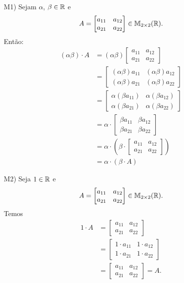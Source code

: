 \documentclass[12pt]{exam}
\begin{document}
\begin{itemize}
        \item[M1)] Sejam $\alpha$, $\beta \in \mathbb{R}$ e
        \[
        A = \begin{bmatrix} a_{11} & a_{12}\\a_{21} & a_{22}\end{bmatrix} \in \mathbb{M}_{2 \times 2}(\mathbb{R}).
        \]
        Então:
        \begin{align*}
            (\alpha\beta)\cdot A & = (\alpha\beta)\begin{bmatrix} a_{11} & a_{12}\\a_{21} & a_{22}\end{bmatrix}
            \\ &= \begin{bmatrix} (\alpha\beta)a_{11} & (\alpha\beta)a_{12}\\(\alpha\beta)a_{21} & (\alpha\beta)a_{22}\end{bmatrix}
            \\ &= \begin{bmatrix} \alpha(\beta a_{11}) & \alpha(\beta a_{12})\\\alpha(\beta a_{21}) & \alpha(\beta a_{22})\end{bmatrix}
            \\ &= \alpha\cdot\begin{bmatrix} \beta a_{11} & \beta a_{12}\\\beta a_{21} & \beta a_{22}\end{bmatrix}
            \\ &= \alpha\cdot\left(\beta\cdot\begin{bmatrix} a_{11} & a_{12}\\a_{21} & a_{22}\end{bmatrix}\right)
            \\ &= \alpha\cdot(\beta\cdot A)
        \end{align*}

        \item[M2)] Seja $1 \in \mathbb{R}$ e
        \[
        A = \begin{bmatrix} a_{11} & a_{12}\\a_{21} & a_{22}\end{bmatrix} \in \mathbb{M}_{2 \times 2}(\mathbb{R}).
        \]
        Temos
        \begin{align*}
            1\cdot A & = \begin{bmatrix} a_{11} & a_{12}\\a_{21} & a_{22}\end{bmatrix}
            \\ &= \begin{bmatrix} 1\cdot a_{11} & 1\cdot a_{12}\\1\cdot a_{21} & 1\cdot a_{22}\end{bmatrix}
            \\ &= \begin{bmatrix} a_{11} & a_{12}\\a_{21} & a_{22}\end{bmatrix} = A.
        \end{align*}


\end{itemize}
\end{document}
